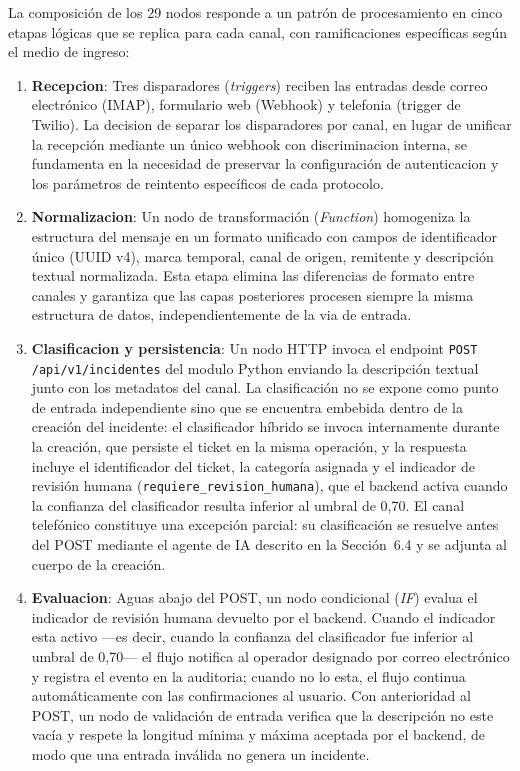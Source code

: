 La composición de los 29 nodos responde a un patrón de procesamiento en cinco etapas lógicas que se replica para cada canal, con ramificaciones específicas según el medio de ingreso:

\begin{enumerate}[leftmargin=*]
  \item \textbf{Recepcion}: Tres disparadores (\emph{triggers}) reciben las entradas desde correo electrónico (IMAP), formulario web (Webhook) y telefonia (trigger de Twilio). La decision de separar los disparadores por canal, en lugar de unificar la recepción mediante un único webhook con discriminacion interna, se fundamenta en la necesidad de preservar la configuración de autenticacion y los parámetros de reintento específicos de cada protocolo.
  \item \textbf{Normalizacion}: Un nodo de transformación (\emph{Function}) homogeniza la estructura del mensaje en un formato unificado con campos de identificador único (UUID v4), marca temporal, canal de origen, remitente y descripción textual normalizada. Esta etapa elimina las diferencias de formato entre canales y garantiza que las capas posteriores procesen siempre la misma estructura de datos, independientemente de la via de entrada.
  \item \textbf{Clasificacion y persistencia}: Un nodo HTTP invoca el endpoint \texttt{POST /api/v1/incidentes} del modulo Python enviando la descripción textual junto con los metadatos del canal. La clasificación no se expone como punto de entrada independiente sino que se encuentra embebida dentro de la creación del incidente: el clasificador híbrido se invoca internamente durante la creación, que persiste el ticket en la misma operación, y la respuesta incluye el identificador del ticket, la categoría asignada y el indicador de revisión humana (\texttt{requiere\_revision\_humana}), que el backend activa cuando la confianza del clasificador resulta inferior al umbral de 0,70. El canal telefónico constituye una excepción parcial: su clasificación se resuelve antes del POST mediante el agente de IA descrito en la Sección~6.4 y se adjunta al cuerpo de la creación.
  \item \textbf{Evaluacion}: Aguas abajo del POST, un nodo condicional (\emph{IF}) evalua el indicador de revisión humana devuelto por el backend. Cuando el indicador esta activo ---es decir, cuando la confianza del clasificador fue inferior al umbral de 0,70--- el flujo notifica al operador designado por correo electrónico y registra el evento en la auditoria; cuando no lo esta, el flujo continua automáticamente con las confirmaciones al usuario. Con anterioridad al POST, un nodo de validación de entrada verifica que la descripción no este vacía y respete la longitud mínima y máxima aceptada por el backend, de modo que una entrada inválida no genera un incidente.

\end{enumerate}
